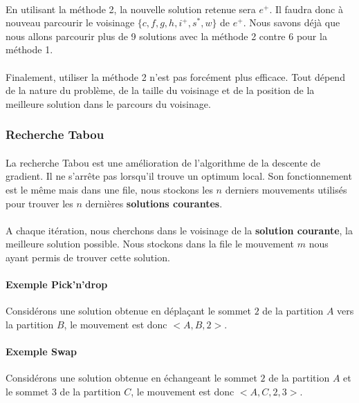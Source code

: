 \documentclass[12pt]{article}
\begin{document}
\paragraph{} En utilisant la méthode 2, la nouvelle solution retenue sera $e^+$. Il faudra donc à nouveau parcourir le voisinage $\{c, f, g, h, i^+, s^*, w\}$ de $e^+$.
Nous savons déjà que nous allons parcourir plus de 9 solutions avec la méthode 2 contre 6 pour la méthode 1.

\paragraph{} Finalement, utiliser la méthode 2 n'est pas forcément plus efficace. Tout dépend de la nature du problème, de la taille du voisinage et de la position de la meilleure solution dans le parcours du voisinage.

\subsubsection{Recherche Tabou}

\paragraph{}La recherche Tabou est une amélioration de l'algorithme de la descente de gradient. Il ne s'arrête pas lorsqu'il trouve un optimum local.
Son fonctionnement est le même mais dans une file, nous stockons les $n$ derniers mouvements utilisés pour trouver les $n$ dernières \textbf{solutions courantes}.

\paragraph{}A chaque itération, nous cherchons dans le voisinage de la \textbf{solution courante}, la meilleure solution possible.
Nous stockons dans la file le mouvement $m$ nous ayant permis de trouver cette solution.

\paragraph{Exemple Pick'n'drop} Considérons une solution obtenue en déplaçant le sommet $2$ de la partition $A$ vers la partition $B$, le mouvement est donc $<A,B,2>$.

\paragraph{Exemple Swap} Considérons une solution obtenue en échangeant le sommet $2$ de la partition $A$ et le sommet $3$ de la partition $C$, le mouvement est donc $<A,C,2,3>$.
\end{document}
